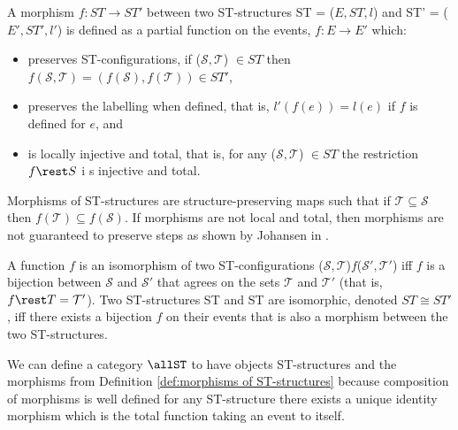     \begin{definition}
        \label{def:morphisms of ST-structures}
        A morphism $f: ST \rightarrow ST'$ between two ST-structures ST = ($E, ST, l$) and ST' = ($E', ST', l'$) is defined as a partial function on the events, $f: E \rightarrow E'$ which:
        
        \begin{itemize}
            \item preserves ST-configurations, if ($\mathcal{S},\mathcal{T}$) $\in ST$ then $f(\mathcal{S},\mathcal{T}) = (f(\mathcal{S}),f(\mathcal{T})) \in ST'$,
            \item preserves the labelling when defined, that is, $l'(f(e)) = l(e)$ if $f$ is defined for $e$, and
            \item is locally injective and total, that is, for any ($\mathcal{S}, \mathcal{T}$) $\in ST$ the restriction $f\rest S$ i s injective and total.
        \end{itemize}
    \end{definition}
    
    Morphisms of ST-structures are structure-preserving maps such that if $\mathcal{T} \subseteq \mathcal{S}$ then $f(\mathcal{T}) \subseteq f(\mathcal{S})$. If morphisms are not local and total, then morphisms are not guaranteed to preserve steps as shown by Johansen in \cite[Proposition 2.21]{Johansen16STstruct}.
    
    \begin{definition}
        \label{def:isomorphic-ST-structures}
        A function $f$ is an isomorphism of two ST-configurations ($\mathcal{S},\mathcal{T}$)$f$($\mathcal{S}',\mathcal{T}'$) iff $f$ is a bijection between $\mathcal{S}$ and $\mathcal{S}'$ that agrees on the sets $\mathcal{T}$ and $\mathcal{T}'$ (that is, $f \rest T = \mathcal{T}'$). Two ST-structures ST and ST are isomorphic, denoted $ST \cong ST'$, iff there exists a bijection $f$ on their events that is also a morphism between the two ST-structures. 
    \end{definition}
    
    
    \begin{definition}
        \label{def:category of ST}
        We can define a category $\allST$ to have objects ST-structures and the morphisms from Definition \ref{def:morphisms of ST-structures} because composition of morphisms is well defined for any ST-structure there exists a unique identity morphism which is the total function taking an event to itself.
    \end{definition}
    
